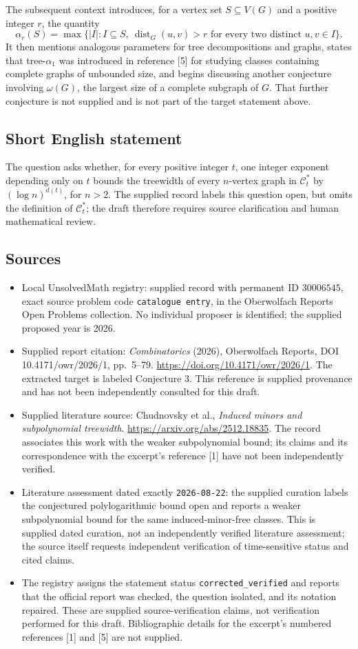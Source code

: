 \documentclass[11pt]{article}
\begin{document}
The subsequent context introduces, for a vertex set \(S\subseteq V(G)\) and a positive integer \(r\), the quantity
\[
\alpha_r(S)=\max\bigl\{|I|:I\subseteq S,\ \operatorname{dist}_G(u,v)>r\text{ for every two distinct }u,v\in I\bigr\}.
\]
It then mentions analogous parameters for tree decompositions and graphs, states that tree-\(\alpha_1\) was introduced in reference [5] for studying classes containing complete graphs of unbounded size, and begins discussing another conjecture involving \(\omega(G)\), the largest size of a complete subgraph of \(G\). That further conjecture is not supplied and is not part of the target statement above.
\subsection{Short English statement}
The question asks whether, for every positive integer \(t\), one integer exponent depending only on \(t\) bounds the treewidth of every \(n\)-vertex graph in \(\mathcal C_t^*\) by \((\log n)^{d(t)}\), for \(n>2\). The supplied record labels this question open, but omits the definition of \(\mathcal C_t^*\); the draft therefore requires source clarification and human mathematical review.
\subsection{Sources}
\begin{itemize}
\item Local UnsolvedMath registry: supplied record with permanent ID \(30006545\), exact source problem code \texttt{catalogue entry}, in the Oberwolfach Reports Open Problems collection. No individual proposer is identified; the supplied proposed year is 2026.
\item Supplied report citation: \emph{Combinatorics} (2026), Oberwolfach Reports, DOI 10.4171/owr/2026/1, pp.~5--79. \url{https://doi.org/10.4171/owr/2026/1}. The extracted target is labeled Conjecture 3. This reference is supplied provenance and has not been independently consulted for this draft.
\item Supplied literature source: Chudnovsky et al., \emph{Induced minors and subpolynomial treewidth}. \url{https://arxiv.org/abs/2512.18835}. The record associates this work with the weaker subpolynomial bound; its claims and its correspondence with the excerpt's reference [1] have not been independently verified.
\item Literature assessment dated exactly \texttt{2026-08-22}: the supplied curation labels the conjectured polylogarithmic bound open and reports a weaker subpolynomial bound for the same induced-minor-free classes. This is supplied dated curation, not an independently verified literature assessment; the source itself requests independent verification of time-sensitive status and cited claims.
\item The registry assigns the statement status \texttt{corrected\_verified} and reports that the official report was checked, the question isolated, and its notation repaired. These are supplied source-verification claims, not verification performed for this draft. Bibliographic details for the excerpt's numbered references [1] and [5] are not supplied.
\end{itemize}
\end{document}
